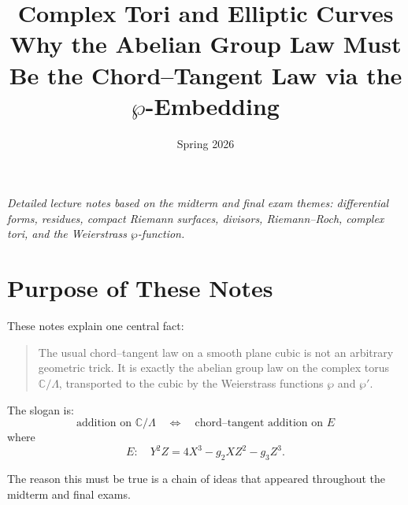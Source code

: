 \documentclass[11pt]{article}
\title{Complex Tori and Elliptic Curves\\
\large Why the Abelian Group Law Must Be the Chord--Tangent Law via the $\wp$-Embedding}
\author{}
\date{Spring 2026}
\newcommand{\C}{\mathbb{C}}
\newcommand{\CP}{\mathbb{CP}}
\begin{document}
\maketitle

\begin{center}
\emph{Detailed lecture notes based on the midterm and final exam themes:
differential forms, residues, compact Riemann surfaces, divisors,
Riemann--Roch, complex tori, and the Weierstrass $\wp$-function.}
\end{center}

\tableofcontents

\section{Purpose of These Notes}

These notes explain one central fact:

\begin{quote}
The usual chord--tangent law on a smooth plane cubic is not an arbitrary
geometric trick.  It is exactly the abelian group law on the complex torus
\(\C/\Lambda\), transported to the cubic by the Weierstrass functions
\(\wp\) and \(\wp'\).
\end{quote}

The slogan is:
\[
\boxed{
\text{addition on }\C/\Lambda
\quad\Longleftrightarrow\quad
\text{chord--tangent addition on }E
}
\]
where
\[
E:\quad Y^2Z=4X^3-g_2XZ^2-g_3Z^3.
\]

The reason this must be true is a chain of ideas that appeared throughout
the midterm and final exams.

\begin{center}
\end{center}
\end{document}
